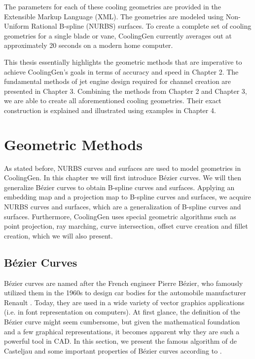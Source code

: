 \documentclass[a4paper, 11pt]{report}
\theoremstyle{definition}
\begin{document}
		The parameters for each of these cooling geometries are provided in the Extensible Markup Language (XML). The geometries are modeled using Non-Uniform Rational B-spline (NURBS) surfaces. To create a complete set of cooling geometries for a single blade or vane, CoolingGen currently averages out at approximately 20 seconds on a modern home computer.
		
		This thesis essentially highlights the geometric methods that are imperative to achieve CoolingGen's goals in terms of accuracy and speed in Chapter 2. The fundamental methods of jet engine design required for channel creation are presented in Chapter 3. Combining the methods from Chapter 2 and Chapter 3, we are able to create all aforementioned cooling geometries. Their exact construction is explained and illustrated using examples in Chapter 4.

\chapter{Geometric Methods}\label{chap:methods}
	As stated before, NURBS curves and surfaces are used to model geometries in CoolingGen. In this chapter we will first introduce Bézier curves. We will then generalize Bézier curves to obtain B-spline curves and surfaces. Applying an embedding map and a projection map to B-spline curves and surfaces, we acquire NURBS curves and surfaces, which are a generalization of B-spline curves and surfaces. Furthermore, CoolingGen uses special geometric algorithms such as point projection, ray marching, curve intersection, offset curve creation and fillet creation, which we will also present.

\section{Bézier Curves}
	Bézier curves are named after the French engineer Pierre Bézier, who famously utilized them in the 1960s to design car bodies for the automobile manufacturer Renault \cite{Bezier1968}. Today, they are used in a wide variety of vector graphics applications (i.e. in font representation on computers). At first glance, the definition of the Bézier curve might seem cumbersome, but given the mathematical foundation and a few graphical representations, it becomes apparent why they are such a powerful tool in CAD. In this section, we present the famous algorithm of de Casteljau and some important properties of Bézier curves according to \cite{Farin2001}.
\end{document}
